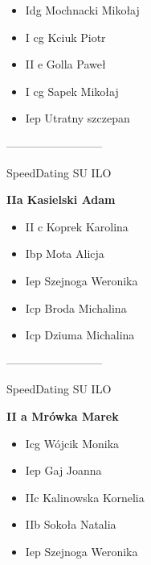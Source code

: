 \documentclass[a4paper,10pt]{article}
\begin{document}
\begin{multicols}{3}
\begin{minipage}[l]{\textwidth}
  \begin{itemize}
    \item Idg Mochnacki Mikołaj
    \item I cg Kciuk Piotr
    \item II e Golla Paweł
    \item I cg Sapek Mikołaj
    \item Iep Utratny szczepan

    \end{itemize}



\end{minipage}



\begin{minipage}[l]{\textwidth}
--------------------------

  \footnotesize{SpeedDating SU ILO}

  \bfseries{IIa Kasielski Adam}

  \begin{itemize}
    \item II c Koprek Karolina
    \item Ibp Mota Alicja
    \item Iep Szejnoga Weronika
    \item Icp Broda Michalina
    \item Icp Dziuma Michalina

    \end{itemize}



\end{minipage}



\begin{minipage}[l]{\textwidth}
--------------------------

  \footnotesize{SpeedDating SU ILO}

  \bfseries{II a Mrówka Marek}

  \begin{itemize}
    \item Icg Wójcik Monika
    \item Iep Gaj Joanna
    \item IIc Kalinowska Kornelia
    \item IIb Sokoła Natalia
    \item Iep Szejnoga Weronika

    \end{itemize}




\end{minipage}
\end{multicols}
\end{document}
